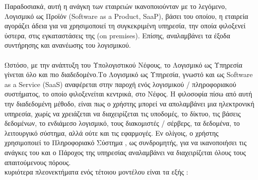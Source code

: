 \documentclass{article}
\begin{document}
Παραδοσιακά, αυτή η ανάγκη των εταιρειών ικανοποιούνταν με το λεγόμενο, Λογισμικό ως Προϊόν (Software as a Product, SaaP), βάσει του οποίου, η εταιρεία αγοράζει άδεια για να χρησιμοποιεί τη συγκεκριμένη υπηρεσία, την οποία φιλοξενεί ύστερα, στις εγκαταστάσεις της (on premises). Επίσης, αναλαμβάνει τα έξοδα συντήρησης και ανανέωσης του λογισμικού. \\ \\
Ωστόσο, με την ανάπτυξη του Υπολογιστικού Νέφους, το Λογισμικό ως Υπηρεσία γίνεται όλο και πιο διαδεδομένο.Το Λογισμικό ως Υπηρεσία, γνωστό και ως Software as a Service (SaaS) αναφέρεται στην παροχή ενός λογισμικού / πληροφοριακού συστήματος, το οποίο φιλοξενείται κεντρικά, στο Νέφος. Η φιλοσοφία πίσω από αυτή την διαδεδομένη μέθοδο, είναι πως ο χρήστης μπορεί να απολαμβάνει μια ηλεκτρονική υπηρεσία, χωρίς να χρειάζεται να διαχειρίζεται τις υποδομές, το δίκτυο, τις βάσεις δεδομένων, το ενδιάμεσο λογισμικό, τους διακομιστές / σέρβερς, τα δεδομένα, το λειτουργικό σύστημα, αλλά ούτε και τις εφαρμογές. Εν ολίγοις, ο χρήστης χρησιμοποιεί το Πληροφοριακό Σύστημα , ως συνδρομητής, για να ικανοποιήσει τις ανάγκες του και ο Πάροχος της υπηρεσίας αναλαμβάνει να διαχειρίζεται όλους τους απαιτούμενους πόρους.  \\ 
 κυριότερα πλεονεκτήματα ενός τέτοιου μοντέλου είναι τα εξής :
\end{document}
